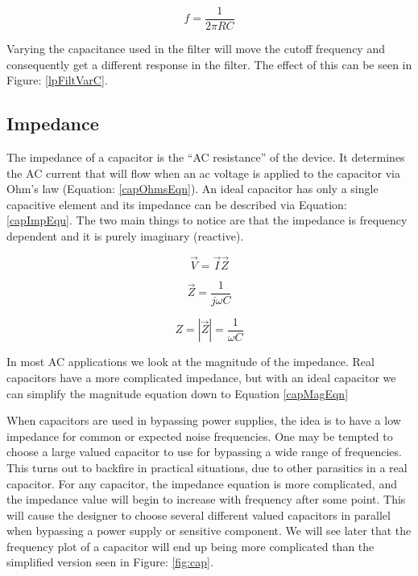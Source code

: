 \begin{equation}
\label{lpfilter_eqn}
f = \frac{1}{2\pi RC}
\end{equation}

Varying the capacitance used in the filter will move the cutoff frequency and consequently get a different response in the filter. The effect of this can be seen in Figure: \ref{lpFiltVarC}.




\subsection{Impedance}

The impedance of a capacitor is the ``AC resistance'' of the device. It determines the AC current that will flow when an ac voltage is applied to the capacitor via Ohm's law (Equation: \eqref{capOhmsEqn}). An ideal capacitor has only a single capacitive element and its impedance can be described via Equation: \eqref{capImpEqu}. The two main things to notice are that the impedance is frequency dependent and it is purely imaginary (reactive).

\begin{equation}
\label{capOhmsEqn}
\vec{V} = \vec{I} \vec{Z}
\end{equation}

\begin{equation}
\label{capImpEqu}
\vec{Z} = \frac{1}{j\omega C}
\end{equation}

\begin{equation}
\label{capMagEqn}
Z = |\vec{Z}| = \frac{1}{\omega C}
\end{equation}

In most AC applications we look at the magnitude of the impedance. Real capacitors have a more complicated impedance, but with an ideal capacitor we can simplify the magnitude equation down to Equation \eqref{capMagEqn}

When capacitors are used in bypassing power supplies, the idea is to have a low impedance for common or expected noise frequencies. One may be tempted to choose a large valued capacitor to use for bypassing a wide range of frequencies. This turns out to backfire in practical situations, due to other parasitics in a real capacitor. For any capacitor, the impedance equation is more complicated, and the impedance value will begin to increase with frequency after some point. This will cause the designer to choose several different valued capacitors in parallel when bypassing a power supply or sensitive component. We will see later that the frequency plot of a capacitor will end up being more complicated than the simplified version seen in Figure: \ref{fig:cap}.

